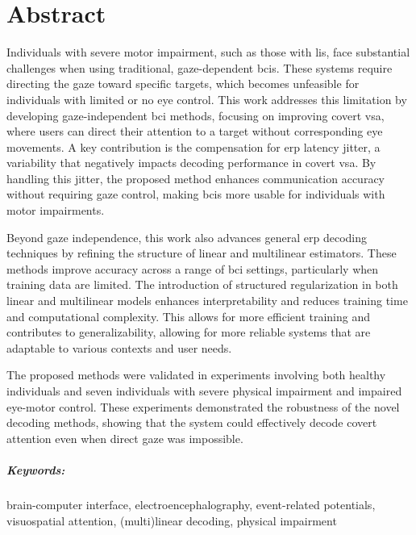 \chapter*{Abstract}

Individuals with severe motor impairment, such as those with \acl{lis}, face substantial challenges when using traditional,
gaze-dependent \acp{bci}.
These systems require directing the gaze toward specific targets, which
becomes unfeasible for individuals with limited or no eye control.
This work addresses this limitation by developing gaze-independent
\ac{bci} methods, focusing on improving covert \ac{vsa}, where users can direct
their attention to a target without corresponding eye movements.
A key contribution is the compensation for \ac{erp} latency jitter, a
variability that negatively impacts decoding performance in covert \ac{vsa}.
By handling this jitter, the proposed method enhances communication accuracy
without requiring gaze control, making \acp{bci} more usable for individuals with
motor impairments.

Beyond gaze independence, this work also advances general \ac{erp} decoding
techniques by refining the structure of linear and multilinear estimators.
These methods improve accuracy across a range of \ac{bci}
settings, particularly when training data are limited.
The introduction of structured regularization in both linear and multilinear
models enhances interpretability and reduces training
time and computational complexity.
This allows for more efficient training and contributes to generalizability,
allowing for more reliable systems that are adaptable to various contexts and
user needs.

The proposed methods were validated in experiments involving both healthy
individuals and seven individuals with severe physical impairment and impaired eye-motor control.
These experiments demonstrated the robustness of the novel decoding methods,
showing that the system could effectively decode covert attention even when
direct gaze was impossible.

\bigskip

\paragraph{Keywords:} brain-computer interface, electroencephalography,
event-related potentials, visuospatial attention, (multi)linear
decoding, physical impairment
